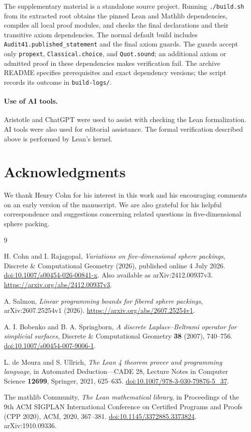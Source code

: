 \documentclass[11pt,a4paper]{article}
\theoremstyle{definition}
\theoremstyle{remark}
\begin{document}
The supplementary material is a standalone source project. Running \texttt{./build.sh}
from its extracted root obtains the pinned Lean and Mathlib dependencies, compiles
all local proof modules, and checks the final declarations and their
transitive axiom dependencies. The normal default build includes
\texttt{Audit41.published\_statement} and the final axiom guards.
The guards accept only
\texttt{propext}, \texttt{Classical.choice}, and \texttt{Quot.sound};
an additional axiom or admitted proof in these dependencies makes
verification fail.
The archive README specifies prerequisites and exact dependency versions;
the script records its outcome in \texttt{build-logs/}.

\paragraph{Use of AI tools.}
Aristotle and ChatGPT were used to assist with checking the Lean
formalization. AI tools were also used for editorial assistance.
The formal verification described above is performed by Lean's kernel.

\section*{Acknowledgments}
We thank Henry Cohn for his interest in this work and his encouraging
comments on an early version of the manuscript. We are also grateful for
his helpful correspondence and suggestions concerning related questions
in five-dimensional sphere packing.

\begin{thebibliography}{9}
\raggedright

H. Cohn and I. Rajagopal,
\emph{Variations on five-dimensional sphere packings},
Discrete \& Computational Geometry (2026), published online 4 July 2026.
\href{https://doi.org/10.1007/s00454-026-00841-x}{doi:10.1007/s00454-026-00841-x}.
Also available as arXiv:2412.00937v3.
\url{https://arxiv.org/abs/2412.00937v3}.

A. Salmon,
\emph{Linear programming bounds for fibered sphere packings},
arXiv:2607.25254v1 (2026).
\url{https://arxiv.org/abs/2607.25254v1}.

A. I. Bobenko and B. A. Springborn,
\emph{A discrete Laplace--Beltrami operator for simplicial surfaces},
Discrete \& Computational Geometry \textbf{38} (2007), 740--756.
\href{https://doi.org/10.1007/s00454-007-9006-1}{doi:10.1007/s00454-007-9006-1}.

L. de Moura and S. Ullrich,
\emph{The Lean 4 theorem prover and programming language},
in Automated Deduction---CADE 28,
Lecture Notes in Computer Science \textbf{12699}, Springer, 2021,
625--635.
\href{https://doi.org/10.1007/978-3-030-79876-5_37}{doi:10.1007/978-3-030-79876-5\_37}.

The mathlib Community,
\emph{The Lean mathematical library},
in Proceedings of the 9th ACM SIGPLAN International Conference on
Certified Programs and Proofs (CPP 2020), ACM, 2020, 367--381.
\href{https://doi.org/10.1145/3372885.3373824}{doi:10.1145/3372885.3373824}.
arXiv:1910.09336.

\end{thebibliography}
\end{document}
